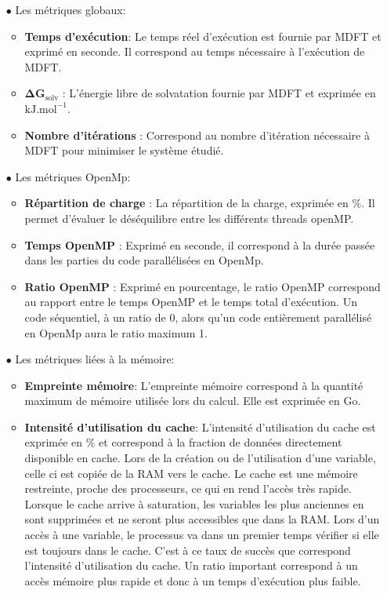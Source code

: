 \begin{itemize}
\item[$\bullet$] Les métriques globaux:
  \begin{itemize}
    \item \textbf{Temps d’exécution}: Le temps réel d'exécution est fournie par MDFT et exprimé en seconde. Il correspond au temps nécessaire à l'exécution de MDFT.
    \item $\mathbf{\Delta G_{\mathrm{solv}}}$ : L’énergie libre de solvatation fournie par MDFT et exprimée en $\mathrm{kJ.mol}^{-1}$.
    \item \textbf{Nombre d'itérations} : Correspond au nombre d'itération nécessaire à MDFT pour minimiser le système étudié.
  \end{itemize}
  \vspace*{1.5ex}%

\item[$\bullet$] Les métriques OpenMp:
  \begin{itemize}
  \item \textbf{Répartition de charge} : La répartition de la charge, exprimée en \%. Il permet d'évaluer le déséquilibre entre les différents threads openMP.
  \item \textbf{Temps OpenMP} : Exprimé en seconde, il correspond à la durée passée dans les parties du code parallélisées en OpenMp.
  \item \textbf{Ratio OpenMP} : Exprimé en pourcentage, le ratio OpenMP correspond au rapport entre le temps OpenMP et le temps total d'exécution. Un code séquentiel, à un ratio de 0, alors qu'un code entièrement parallélisé en OpenMp aura le ratio maximum 1. 
  \end{itemize}
  \vspace*{1.5ex}%

\item[$\bullet$] Les métriques liées à la mémoire:
  \begin{itemize}
  \item \textbf{Empreinte mémoire}: L'empreinte mémoire correspond à la quantité maximum de mémoire utilisée lors du calcul. Elle est exprimée en Go.
  \item \textbf{Intensité d'utilisation du cache}: L'intensité d'utilisation du cache est exprimée en \% et correspond à la fraction de données directement disponible en cache. Lors de la création ou de l'utilisation d'une variable, celle ci est copiée de la RAM vers le cache. Le cache est une mémoire restreinte, proche des processeurs, ce qui en rend l'accès très rapide. Lorsque le cache arrive à saturation, les variables les plus anciennes en sont supprimées et ne seront plus accessibles que dans la RAM. Lors d'un accès à une variable, le processus va dans un premier temps vérifier si elle est toujours dans le cache. C'est à ce taux de succès que correspond l'intensité d'utilisation du cache. Un ratio important correspond à un accès mémoire plus rapide et donc à un temps d'exécution plus faible.
  \end{itemize}
  \vspace*{1.5ex}%


\end{itemize}
